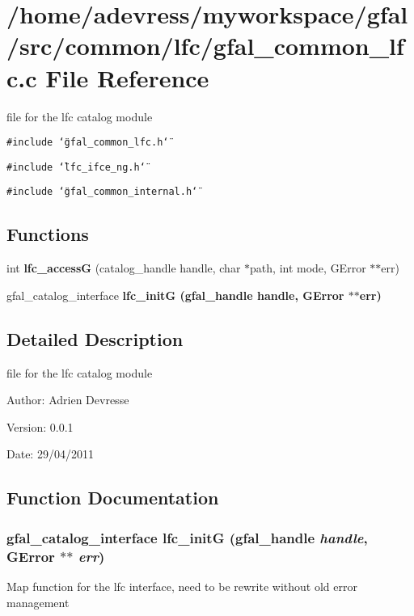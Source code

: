 \section{/home/adevress/myworkspace/gfal/src/common/lfc/gfal\_\-common\_\-lfc.c File Reference}
\label{gfal__common__lfc_8c}
file for the lfc catalog module 

{\tt \#include \char`\"{}gfal\_\-common\_\-lfc.h\char`\"{}}\par
{\tt \#include \char`\"{}lfc\_\-ifce\_\-ng.h\char`\"{}}\par
{\tt \#include \char`\"{}gfal\_\-common\_\-internal.h\char`\"{}}\par
\subsection*{Functions}
\begin{CompactItemize}
\item 
int \textbf{lfc\_\-access\-G} (catalog\_\-handle handle, char $\ast$path, int mode, GError $\ast$$\ast$err)\label{gfal__common__lfc_8c_33267b829d841c337ec0d3a254b7e31a}

\item 
gfal\_\-catalog\_\-interface \bf{lfc\_\-init\-G} (gfal\_\-handle handle, GError $\ast$$\ast$err)
\end{CompactItemize}


\subsection{Detailed Description}
file for the lfc catalog module 

\begin{Desc}
\item[Author:]Adrien Devresse \end{Desc}
\begin{Desc}
\item[Version:]0.0.1 \end{Desc}
\begin{Desc}
\item[Date:]29/04/2011 \end{Desc}


\subsection{Function Documentation}
\subsubsection{\setlength{\rightskip}{0pt plus 5cm}gfal\_\-catalog\_\-interface lfc\_\-init\-G (gfal\_\-handle {\em handle}, GError $\ast$$\ast$ {\em err})}\label{gfal__common__lfc_8c_18fc1e787694363fd5457f9b8f020cf8}


Map function for the lfc interface, need to be rewrite without old error management 